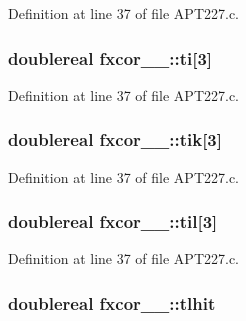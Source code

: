 Definition at line 37 of file A\+P\+T227.\+c.

\subsubsection[{\texorpdfstring{ti}{ti}}]{\setlength{\rightskip}{0pt plus 5cm}doublereal fxcor\+\_\+\_\+\+::ti\mbox{[}3\mbox{]}}\hypertarget{structfxcor__1___a493e91923d4090e0c86da8ea1f099bf1}{}\label{structfxcor__1___a493e91923d4090e0c86da8ea1f099bf1}


Definition at line 37 of file A\+P\+T227.\+c.

\subsubsection[{\texorpdfstring{tik}{tik}}]{\setlength{\rightskip}{0pt plus 5cm}doublereal fxcor\+\_\+\_\+\+::tik\mbox{[}3\mbox{]}}\hypertarget{structfxcor__1___a3991f01d65eb1787c59c4733c99e389f}{}\label{structfxcor__1___a3991f01d65eb1787c59c4733c99e389f}


Definition at line 37 of file A\+P\+T227.\+c.

\subsubsection[{\texorpdfstring{til}{til}}]{\setlength{\rightskip}{0pt plus 5cm}doublereal fxcor\+\_\+\_\+\+::til\mbox{[}3\mbox{]}}\hypertarget{structfxcor__1___a060dd257a3c55b5a22f5cef7542d27bd}{}\label{structfxcor__1___a060dd257a3c55b5a22f5cef7542d27bd}


Definition at line 37 of file A\+P\+T227.\+c.

\subsubsection[{\texorpdfstring{tlhit}{tlhit}}]{\setlength{\rightskip}{0pt plus 5cm}doublereal fxcor\+\_\+\_\+\+::tlhit}\hypertarget{structfxcor__1___a2333a0c5d894393900de07f5bf5cb3a3}{}\label{structfxcor__1___a2333a0c5d894393900de07f5bf5cb3a3}


